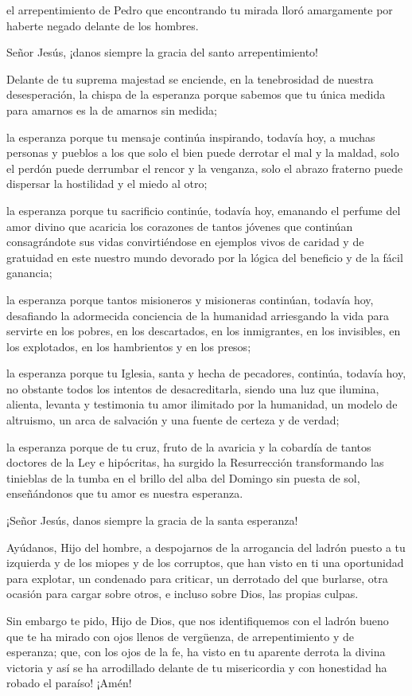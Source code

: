 \begin{body}
el arrepentimiento de Pedro que encontrando tu mirada lloró amargamente por haberte negado delante de los hombres. 

Señor Jesús, ¡danos siempre la gracia del santo arrepentimiento! 

Delante de tu suprema majestad se enciende, en la tenebrosidad de nuestra desesperación, la chispa de la esperanza porque sabemos que tu única medida para amarnos es la de amarnos sin medida; 

la esperanza porque tu mensaje continúa inspirando, todavía hoy, a muchas personas y pueblos a los que solo el bien puede derrotar el mal y la maldad, solo el perdón puede derrumbar el rencor y la venganza, solo el abrazo fraterno puede dispersar la hostilidad y el miedo al otro; 

la esperanza porque tu sacrificio continúe, todavía hoy, emanando el perfume del amor divino que acaricia los corazones de tantos jóvenes que continúan consagrándote sus vidas convirtiéndose en ejemplos vivos de caridad y de gratuidad en este nuestro mundo devorado por la lógica del beneficio y de la fácil ganancia; 

la esperanza porque tantos misioneros y misioneras continúan, todavía hoy, desafiando la adormecida conciencia de la humanidad arriesgando la vida para servirte en los pobres, en los descartados, en los inmigrantes, en los invisibles, en los explotados, en los hambrientos y en los presos; 

la esperanza porque tu Iglesia, santa y hecha de pecadores, continúa, todavía hoy, no obstante todos los intentos de desacreditarla, siendo una luz que ilumina, alienta, levanta y testimonia tu amor ilimitado por la humanidad, un modelo de altruismo, un arca de salvación y una fuente de certeza y de verdad; 

la esperanza porque de tu cruz, fruto de la avaricia y la cobardía de tantos doctores de la Ley e hipócritas, ha surgido la Resurrección transformando las tinieblas de la tumba en el brillo del alba del Domingo sin puesta de sol, enseñándonos que tu amor es nuestra esperanza. 

¡Señor Jesús, danos siempre la gracia de la santa esperanza!

Ayúdanos, Hijo del hombre, a despojarnos de la arrogancia del ladrón puesto a tu izquierda y de los miopes y de los corruptos, que han visto en ti una oportunidad para explotar, un condenado para criticar, un derrotado del que burlarse, otra ocasión para cargar sobre otros, e incluso sobre Dios, las propias culpas. 

Sin embargo te pido, Hijo de Dios, que nos identifiquemos con el ladrón bueno que te ha mirado con ojos llenos de vergüenza, de arrepentimiento y de esperanza; que, con los ojos de la fe, ha visto en tu aparente derrota la divina victoria y así se ha arrodillado delante de tu misericordia y con honestidad ha robado el paraíso! ¡Amén!
\end{body}

